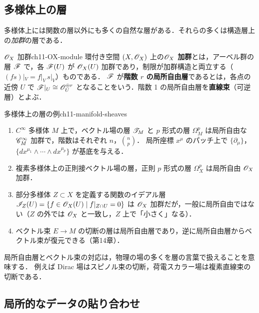 \subsection{多様体上の層}

多様体上には関数の層以外にも多くの自然な層がある．それらの多くは構造層上の\emph{加群}の層である．

\begin{mydef}{$\mathscr{O}_X$ 加群}{ch11-OX-module}
環付き空間 $(X,\mathscr{O}_X)$ 上の\textbf{$\mathscr{O}_X$ 加群}とは，アーベル群の層 $\mathscr{F}$ で，各 $\mathscr{F}(U)$ が $\mathscr{O}_X(U)$ 加群であり，制限が加群構造と両立する（$(fs)|_V=f|_V\,s|_V$）ものである．
$\mathscr{F}$ が\textbf{階数 $r$ の局所自由層}であるとは，各点の近傍 $U$ で $\mathscr{F}|_U\cong\mathscr{O}_U^{\oplus r}$ となることをいう．階数 1 の局所自由層を\textbf{直線束}（可逆層）とよぶ．
\end{mydef}

\begin{myex}{多様体上の層の例}{ch11-manifold-sheaves}
\begin{enumerate}
  \item $C^\infty$ 多様体 $M$ 上で，ベクトル場の層 $\mathscr{T}_M$ と $p$ 形式の層 $\Omega^p_M$ は局所自由な $\mathscr{C}^\infty_M$ 加群で，階数はそれぞれ $n$，$\binom{n}{p}$．
  局所座標 $x^\mu$ のパッチ上で $\{\partial_\mu\}$，$\{dx^{\mu_1}\wedge\cdots\wedge dx^{\mu_p}\}$ が基底を与える．
  \item 複素多様体上の正則接ベクトル場の層，正則 $p$ 形式の層 $\Omega^p_X$ は局所自由 $\mathscr{O}_X$ 加群．
  \item 部分多様体 $Z\subset X$ を定義する関数のイデアル層 $\mathscr{I}_Z(U)=\{f\in\mathscr{O}_X(U)\mid f|_{Z\cap U}=0\}$ は $\mathscr{O}_X$ 加群だが，一般に局所自由ではない（$Z$ の外では $\mathscr{O}_X$ と一致し，$Z$ 上で「小さく」なる）．
  \item ベクトル束 $E\to M$ の切断の層は局所自由層であり，逆に局所自由層からベクトル束が復元できる（第14章）．
\end{enumerate}
\end{myex}

局所自由層とベクトル束の対応は，物理の場の多くを層の言葉で扱えることを意味する．
例えば Dirac 場はスピノル束の切断，荷電スカラー場は複素直線束の切断である．

\subsection{局所的なデータの貼り合わせ}

